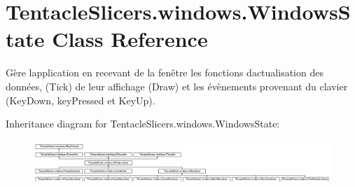 \hypertarget{class_tentacle_slicers_1_1windows_1_1_windows_state}{}\section{Tentacle\+Slicers.\+windows.\+Windows\+State Class Reference}
\label{class_tentacle_slicers_1_1windows_1_1_windows_state}


Gère l\textquotesingle{}application en recevant de la fenêtre les fonctions d\textquotesingle{}actualisation des données, (Tick) de leur affichage (Draw) et les évènements provenant du clavier (Key\+Down, key\+Pressed et Key\+Up).  


Inheritance diagram for Tentacle\+Slicers.\+windows.\+Windows\+State\+:\begin{figure}[H]
\begin{center}
\leavevmode
\includegraphics[height=1.709402cm]{class_tentacle_slicers_1_1windows_1_1_windows_state}
\end{center}
\end{figure}

